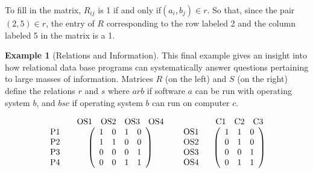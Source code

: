\documentclass[10pt,]{book}
\theoremstyle{plain}
\theoremstyle{definition}
\theoremstyle{definition}
\theoremstyle{definition}
\newtheorem{example}[theorem]{Example}
\theoremstyle{definition}
\begin{document}
To fill in the matrix, \(R_{ij}\) is 1 if and only if\(\left(a_i,b_j\right) \in r\). So that, since the pair \((2, 5) \in r\), the entry of \(R\) corresponding to the row labeled 2 and the column labeled 5 in the matrix is a 1.%
\begin{example}[Relations and Information]\label{ex-relations-information}
This final example gives an insight into how relational data base programs can systematically answer questions pertaining to large masses of information. Matrices \(R\) (on the left) and \(S\) (on the right) define the relations \(r\) and \(s\) where
\(a r b\) if software \(a\) can be run with operating system \(b\), and \(b s c\) if operating system \(b\) can run on computer \(c\).

\begin{equation*}\begin{array}{cc}
   & 
\begin{array}{cccc}
 \text{OS1} & \text{OS2} & \text{OS3} & \text{OS4} \\
\end{array}
 \\ 
\begin{array}{c}
 \text{P1} \\
 \text{P2} \\
 \text{P3} \\
 \text{P4} \\
\end{array}
 & \left(
\begin{array}{cccc}
  1  &  0  &  1  &  0  \\
  1  &  1  & 0 & 0 \\
 0 & 0 & 0 &  1  \\
 0 & 0 &  1  &  1  \\
\end{array}
\right) \\
\end{array}\)       \(\begin{array}{cc}
   & 
\begin{array}{ccc}
 \text{C1} & \text{C2} & \text{C3} \\
\end{array}
 \\
 
\begin{array}{c}
 \text{OS1} \\
 \text{OS2} \\
 \text{OS3} \\
 \text{OS4} \\
\end{array}
 & \left(
\begin{array}{ccc}
  1  &  1  & 0 \\
 0 &  1  & 0 \\
 0 & 0 &  1  \\
 0 &  1  &  1  \\
\end{array}
\right) \\
\end{array}\end{equation*}


\end{example}
\end{document}
